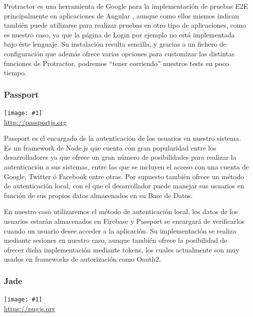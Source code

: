 \documentclass[11pt,openany]{book}
\newcommand{\logo}[2]{\medskip\begin{center}\texttt{[image: \#1]}\\\scriptsize\url{#2}\end{center}\bigskip}
\begin{document}
Protractor es una herramienta de Google para la implementación de pruebas E2E principalmente en aplicaciones de Angular \cite{11}, aunque como ellos mismos indican también puede utilizarse para realizar pruebas en otro tipo de aplicaciones, como es nuestro caso, ya que la página de Login por ejemplo no está implementada bajo éste lenguaje. Su instalación resulta sencilla, y gracias a un fichero de configuración que además ofrece varias opciones para customizar las distintas funciones de Protractor, podremos ``tener corriendo'' nuestros tests en poco tiempo.

\subsubsection{Passport}

\logo{logos/passport.png}{http://passportjs.org}

Passport es el encargado de la autenticación de los usuarios en nuestro sistema. Es un framework de Node.js que cuenta con gran popularidad entre los desarrolladores ya que ofrece un gran número de posibilidades para realizar la autenticación a sus sistemas, entre las que se incluyen el acceso con una cuenta de Google, Twitter ó Facebook entre otras. Por supuesto también ofrece un método de autenticación local, con el que el desarrollador puede manejar sus usuarios en función de sus propios datos almacenados en su Base de Datos. 

En nuestro caso utilizaremos el método de autenticación local, los datos de los usuarios estarán almacenados en Firebase y Passport se encargará de verificarlos cuando un usuario desee acceder a la aplicación. Su implementación se realiza mediante sesiones en nuestro caso, aunque también ofrece la posibilidad de ofrecer dicha implementación mediante tokens, los cuales actualmente son muy usados en frameworks de autorización como Oauth2.

\subsubsection{Jade}

\logo{logos/jade.png}{https://pugjs.org}
\end{document}
